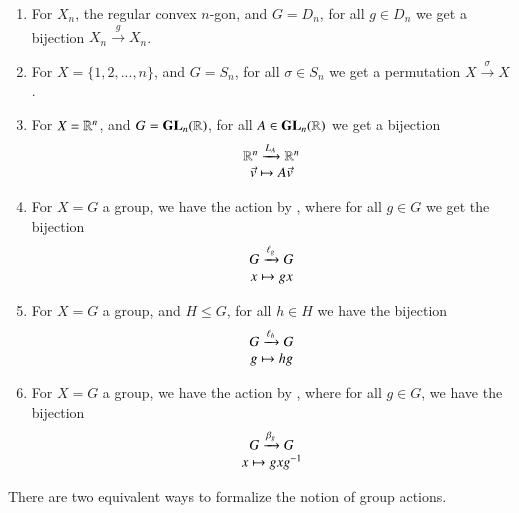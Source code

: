\documentclass[12pt, a4paper, oneside, openright, titlepage]{book}
\begin{document}
\begin{eg}
        \leavevmode
        \begin{enumerate}
                \item For $X_n$, the regular convex $n$-gon, and $G = D_n$, for all $g \in D_n$ we get a bijection $X_n \xrightarrow{g} X_n$.
                \item For $X = \{1,2,...,n\}$, and $G = S_n$, for all $\sigma \in S_n$ we get a permutation $X \xrightarrow{\sigma} X$.
                \item For $X = \mathbb R^n$, and $G = \mathbf{GL}_n(\mathbb R)$, for all $A \in \mathbf{GL}_n(\mathbb R)$ we get a bijection \begin{equation}
                                \begin{array}{c} \mathbb R^n\xrightarrow{L_A}\mathbb R^n \\ \vec{v} \mapsto A\vec{v} \end{array}
                \end{equation}
                \item For $X = G$ a group, we have the action by , where for all $g \in G$ we get the bijection \begin{equation}
                                \begin{array}{c} G\xrightarrow{\ell_g}G \\ x\mapsto gx \end{array}
                \end{equation}
                \item For $X = G$ a group, and $H \leq G$, for all $h \in H$ we have the bijection \begin{equation}
                                \begin{array}{c} G \xrightarrow{\ell_h} G \\ g \mapsto hg \end{array}
                \end{equation}
                \item For $X = G$ a group, we have the action by , where for all $g \in G$, we have the bijection \begin{equation}
                                \begin{array}{c} G\xrightarrow{\beta_g}G \\ x\mapsto gxg^{-1} \end{array}
                \end{equation}
        \end{enumerate}
\end{eg}

\begin{rmk}
        There are two equivalent ways to formalize the notion of group actions.
\end{rmk}
\end{document}

